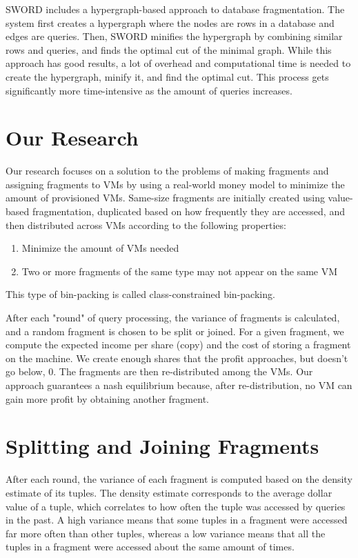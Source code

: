 \documentclass{brandiss}
\numberwithin{section}{chapter}
\numberwithin{figure}{chapter}
\theoremstyle{definition}
\theoremstyle{plain}
\theoremstyle{remark}
\begin{document}
SWORD includes a hypergraph-based approach to database fragmentation. The system first creates a hypergraph where the nodes are rows in a database and edges are queries. Then, SWORD minifies the hypergraph by combining similar rows and queries, and finds the optimal cut of the minimal graph. While this approach has good results, a lot of overhead and computational time is needed to create the hypergraph, minify it, and find the optimal cut. This process gets significantly more time-intensive as the amount of queries increases.

\section{Our Research}

Our research focuses on a solution to the problems of making fragments and assigning fragments to VMs by using a real-world money model to minimize the amount of provisioned VMs. Same-size fragments are initially created using value-based fragmentation, duplicated based on how frequently they are accessed, and then distributed across VMs according to the following properties:

\begin{enumerate}
\item Minimize the amount of VMs needed
\item Two or more fragments of the same type may not appear on the same VM
\end{enumerate}

This type of bin-packing is called class-constrained bin-packing.

After each "round" of query processing, the variance of fragments is calculated, and a random fragment is chosen to be split or joined. For a given fragment, we compute the expected income per share (copy) and the cost of storing a fragment on the machine. We create enough shares that the profit approaches, but doesn't go below, 0. The fragments are then re-distributed among the VMs. Our approach guarantees a nash equilibrium because, after re-distribution, no VM can gain more profit by obtaining another fragment.

\section{Splitting and Joining Fragments}

After each round, the variance of each fragment is computed based on the density estimate of its tuples. The density estimate corresponds to the average dollar value of a tuple, which correlates to how often the tuple was accessed by queries in the past. A high variance means that some tuples in a fragment were accessed far more often than other tuples, whereas a low variance means that all the tuples in a fragment were accessed about the same amount of times.
\end{document}
